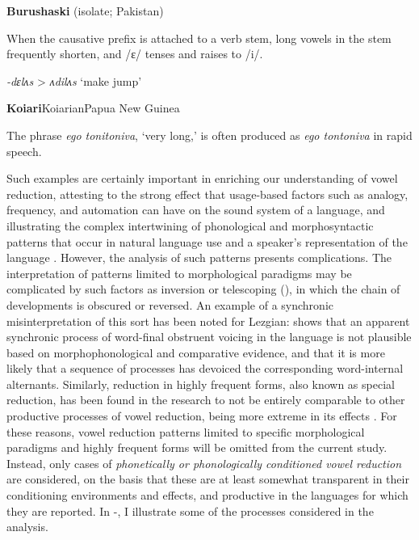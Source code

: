 \ea\label{ex:6.4}
   \textbf{Burushaski} (isolate; Pakistan)

When the causative prefix is attached to a verb stem, long vowels in the stem frequently shorten, and /ɛ/ tenses and raises to /i/.

\textit{-dɛlʌs} > \textit{ʌdilʌs} ‘make jump’
\citep[1030]{Anderson1997}
\z

\ea\label{ex:6.5}
 \textbf{Koiari}{Koiarian}{Papua New Guinea}

The phrase \textit{ego tonitoniva}, ‘very long,’ is often produced as \textit{ego tontoniva} in rapid speech.
\citep[7]{Dutton1996}
\z

  Such examples are certainly important in enriching our understanding of vowel reduction, attesting to the strong effect that usage-based factors such as analogy, frequency, and automation can have on the sound system of a language, and illustrating the complex intertwining of phonological and morphosyntactic patterns that occur in natural language use and a speaker’s representation of the language \citep{Bybee2001}. However, the analysis of such patterns presents complications. The interpretation of patterns limited to morphological paradigms may be complicated by such factors as inversion or telescoping (\citealt{Vennemann1972,Hyman1975}), in which the chain of developments is obscured or reversed. An example of a synchronic misinterpretation of this sort has been noted for Lezgian: \citet{Yu2004} shows that an apparent synchronic process of word-final obstruent voicing in the language is not plausible based on morphophonological and comparative evidence, and that it is more likely that a sequence of processes has devoiced the corresponding word-internal alternants. Similarly, reduction in highly frequent forms, also known as special reduction, has been found in the research to not be entirely comparable to other productive processes of vowel reduction, being more extreme in its effects \citep{BybeeEtAl2016}. For these reasons, vowel reduction patterns limited to specific morphological paradigms and highly frequent forms will be omitted from the current study. Instead, only cases of \textit{phonetically or phonologically conditioned vowel reduction} are considered, on the basis that these are at least somewhat transparent in their conditioning environments and effects, and productive in the languages for which they are reported. In -, I illustrate some of the processes considered in the analysis.

\ea\label{ex:6.6}

